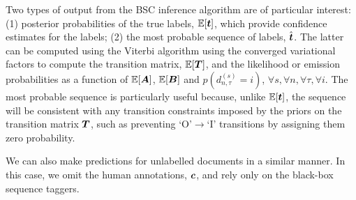 Two types of output from the BSC inference algorithm are of particular interest: (1) posterior probabilities of 
the true labels, $\mathbb{E}[\boldsymbol t]$, which provide confidence estimates for the labels; (2) the most 
probable sequence of labels, $\hat{\boldsymbol t}$. The latter can be computed using the Viterbi algorithm 
using the converged variational factors to compute the transition matrix, $\mathbb{E}[\boldsymbol T]$,
and the likelihood or emission probabilities as a function of $\mathbb{E}[\boldsymbol A]$, $\mathbb{E}[\boldsymbol B]$ and
$\hat{p}(d_{n,\tau}^{(s)}=i)$, $\forall s, \forall n, \forall \tau, \forall i$.
The most probable sequence is particularly useful because, unlike $\mathbb{E}[\boldsymbol t]$,
the sequence will be consistent with any transition 
constraints imposed by the priors on the transition matrix $\boldsymbol T$, 
such as preventing `O'$\rightarrow$`I' transitions by assigning them zero probability.

We can also make predictions for unlabelled documents in a similar manner. In this case, we omit the 
human annotations, $\boldsymbol c$, and rely only on the black-box sequence taggers.

